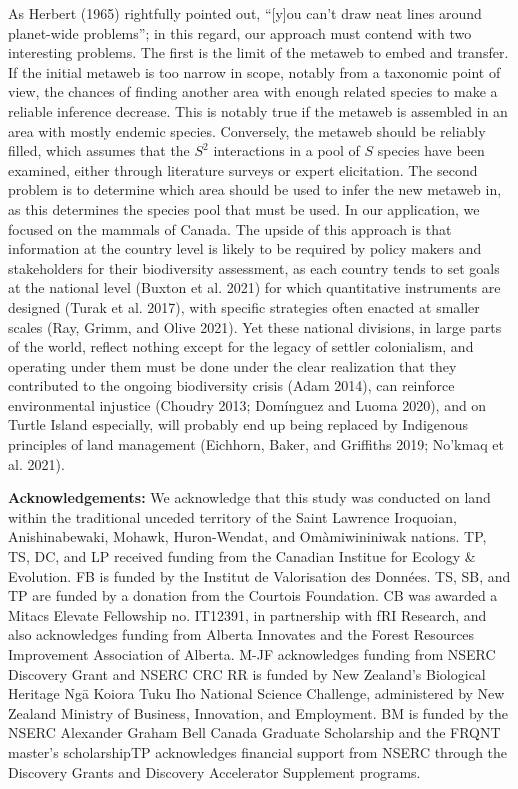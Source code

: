 \documentclass[10pt,oneside]{article}
\begin{document}
As Herbert (1965) rightfully pointed out, ``{[}y{]}ou can't draw neat
lines around planet-wide problems''; in this regard, our approach must
contend with two interesting problems. The first is the limit of the
metaweb to embed and transfer. If the initial metaweb is too narrow in
scope, notably from a taxonomic point of view, the chances of finding
another area with enough related species to make a reliable inference
decrease. This is notably true if the metaweb is assembled in an area
with mostly endemic species. Conversely, the metaweb should be reliably
filled, which assumes that the \(S^2\) interactions in a pool of \(S\)
species have been examined, either through literature surveys or expert
elicitation. The second problem is to determine which area should be
used to infer the new metaweb in, as this determines the species pool
that must be used. In our application, we focused on the mammals of
Canada. The upside of this approach is that information at the country
level is likely to be required by policy makers and stakeholders for
their biodiversity assessment, as each country tends to set goals at the
national level (Buxton et al. 2021) for which quantitative instruments
are designed (Turak et al. 2017), with specific strategies often enacted
at smaller scales (Ray, Grimm, and Olive 2021). Yet these national
divisions, in large parts of the world, reflect nothing except for the
legacy of settler colonialism, and operating under them must be done
under the clear realization that they contributed to the ongoing
biodiversity crisis (Adam 2014), can reinforce environmental injustice
(Choudry 2013; Domínguez and Luoma 2020), and on Turtle Island
especially, will probably end up being replaced by Indigenous principles
of land management (Eichhorn, Baker, and Griffiths 2019; No'kmaq et al.
2021).

\textbf{Acknowledgements:} We acknowledge that this study was conducted
on land within the traditional unceded territory of the Saint Lawrence
Iroquoian, Anishinabewaki, Mohawk, Huron-Wendat, and Omàmiwininiwak
nations. TP, TS, DC, and LP received funding from the Canadian Institue
for Ecology \& Evolution. FB is funded by the Institut de Valorisation
des Données. TS, SB, and TP are funded by a donation from the Courtois
Foundation. CB was awarded a Mitacs Elevate Fellowship no. IT12391, in
partnership with fRI Research, and also acknowledges funding from
Alberta Innovates and the Forest Resources Improvement Association of
Alberta. M-JF acknowledges funding from NSERC Discovery Grant and NSERC
CRC RR is funded by New Zealand's Biological Heritage Ngā Koiora Tuku
Iho National Science Challenge, administered by New Zealand Ministry of
Business, Innovation, and Employment. BM is funded by the NSERC
Alexander Graham Bell Canada Graduate Scholarship and the FRQNT master's
scholarshipTP acknowledges financial support from NSERC through the
Discovery Grants and Discovery Accelerator Supplement programs.
\end{document}
